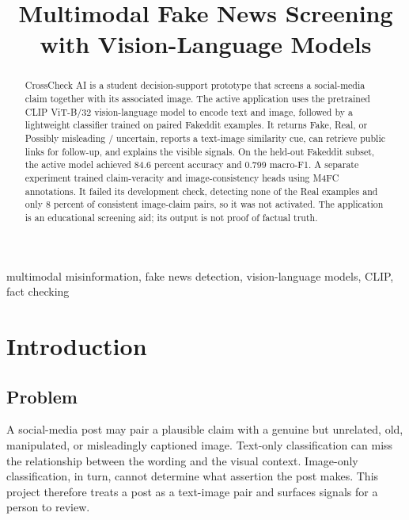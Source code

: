 \documentclass[conference]{IEEEtran}
\begin{document}
\title{Multimodal Fake News Screening with Vision-Language Models}

\author{
\and
{}
\and
{}
\and
{}
}

\maketitle

\begin{abstract}
CrossCheck AI is a student decision-support prototype that screens a social-media claim together with its associated image. The active application uses the pretrained CLIP ViT-B/32 vision-language model to encode text and image, followed by a lightweight classifier trained on paired Fakeddit examples. It returns Fake, Real, or Possibly misleading / uncertain, reports a text-image similarity cue, can retrieve public links for follow-up, and explains the visible signals. On the held-out Fakeddit subset, the active model achieved 84.6 percent accuracy and 0.799 macro-F1. A separate experiment trained claim-veracity and image-consistency heads using M4FC annotations. It failed its development check, detecting none of the Real examples and only 8 percent of consistent image-claim pairs, so it was not activated. The application is an educational screening aid; its output is not proof of factual truth.
\end{abstract}

\begin{IEEEkeywords}
multimodal misinformation, fake news detection, vision-language models, CLIP, fact checking
\end{IEEEkeywords}

\section{Introduction}
\subsection{Problem}
A social-media post may pair a plausible claim with a genuine but unrelated, old, manipulated, or misleadingly captioned image. Text-only classification can miss the relationship between the wording and the visual context. Image-only classification, in turn, cannot determine what assertion the post makes. This project therefore treats a post as a text-image pair and surfaces signals for a person to review.
\end{document}
